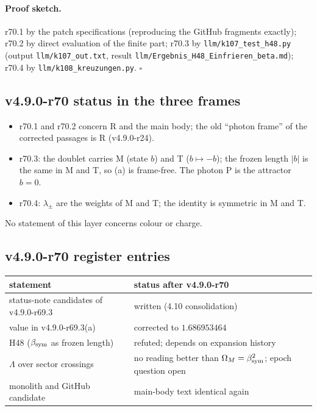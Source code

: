 \paragraph{Proof sketch.}
r70.1 by the patch specifications (reproducing the GitHub fragments exactly); r70.2 by direct evaluation of the finite part; r70.3 by
\texttt{llm/k107\_test\_h48.py} (output \texttt{llm/k107\_out.txt}, result \texttt{llm/Ergebnis\_H48\_Einfrieren\_beta.md}); r70.4 by
\texttt{llm/k108\_kreuzungen.py}.  \(\square\)

\subsection*{v4.9.0-r70 status in the three frames}
\label{subsec:v490-r70-frames}

\begin{itemize}[leftmargin=2em]
\item r70.1 and r70.2 concern R and the main body; the old ``photon frame'' of the corrected passages is R (v4.9.0-r24).
\item r70.3: the doublet carries M (state \(b\)) and T (\(b\mapsto-b\)); the frozen length \(|b|\) is the same in M and T, so (a) is frame-free.  The
photon P is the attractor \(b=0\).
\item r70.4: \(\lambda_\pm\) are the weights of M and T; the identity is symmetric in M and T.
\end{itemize}
No statement of this layer concerns colour or charge.

\subsection*{v4.9.0-r70 register entries}
\label{subsec:v490-r70-register}

\begin{center}
\small
\begin{tabular}{@{}>{\raggedright\arraybackslash}p{}>{\raggedright\arraybackslash}p{}@{}}
\toprule
statement & status after v4.9.0-r70\\
\midrule
status-note candidates of v4.9.0-r69.3 & written (4.10 consolidation)\\
value in v4.9.0-r69.3(a) & corrected to \(1.686953464\)\\
H48 (\(\beta_{\mathrm{sym}}\) as frozen length) & refuted; depends on expansion history\\
\(\Lambda\) over sector crossings & no reading better than \(\Omega_M=\beta_{\mathrm{sym}}^2\); epoch question open\\
monolith and GitHub candidate & main-body text identical again\\
\bottomrule
\end{tabular}
\end{center}

